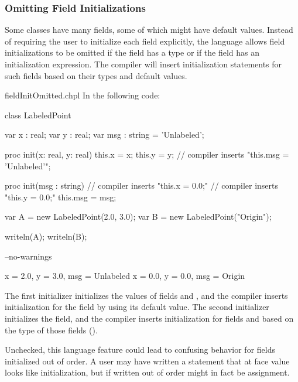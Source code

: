 \subsubsection{Omitting Field Initializations}
\label{Omitting_Field_Initializations}

Some classes have many fields, some of which might have default values. Instead
of requiring the user to initialize each field explicitly, the language allows
field initializations to be omitted if the field has a type or if the field
has an initialization expression. The compiler will insert initialization
statements for such fields based on their types and default values.

\begin{chapelexample}{fieldInitOmitted.chpl}
In the following code:
\begin{chapel}
class LabeledPoint {
  var x : real;
  var y : real;
  var msg : string = 'Unlabeled';

  proc init(x: real, y: real) {
    this.x = x;
    this.y = y;
    // compiler inserts "this.msg = 'Unlabeled'";
  }

  proc init(msg : string) {
    // compiler inserts "this.x = 0.0;"
    // compiler inserts "this.y = 0.0;"
    this.msg = msg;
  }
}

var A = new LabeledPoint(2.0, 3.0);
var B = new LabeledPoint("Origin");
\end{chapel}
\begin{chapelpost}
writeln(A);
writeln(B);
\end{chapelpost}
\begin{chapelcompopts}
--no-warnings
\end{chapelcompopts}
\begin{chapeloutput}
{x = 2.0, y = 3.0, msg = Unlabeled}
{x = 0.0, y = 0.0, msg = Origin}
\end{chapeloutput}
The first initializer initializes the values of fields  and ,
and the compiler inserts initialization for the  field by using
its default value. The second initializer initializes the  field,
and the compiler inserts initialization for fields  and 
based on the type of those fields ().
\end{chapelexample}

Unchecked, this language feature could lead to confusing behavior for fields
initialized out of order. A user may have written a statement that at face
value looks like initialization, but if written out of order might in fact be
assignment.

